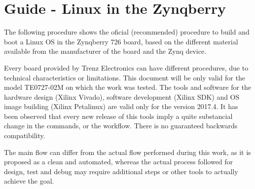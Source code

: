 

\chapter{Guide - Linux in the Zynqberry}

The following procedure shows the oficial (recommended) procedure to build and boot a Linux OS in the Zynqberry 726 board, based on the different material available from the manufacturer of the board and the Zynq device.

Every board provided by Trenz Electronics can have different procedures, due to technical characteristics or limitations. This document will be only valid for the model TE0727-02M on which the work was tested. The tools and software for the hardware design (Xilinx Vivado), software development (Xilinx SDK) and OS image building (Xilinx Petalinux) are valid only for the version 2017.4. It has been observed that every new release of this tools imply a quite substancial change in the commands, or the workflow. There is no guaranteed backwards compatibility.

The main flow can differ from the actual flow performed during this work, as it is proposed as a clean and automated, whereas the actual process followed for design, test and debug may require additional steps or other tools to actually achieve the goal.